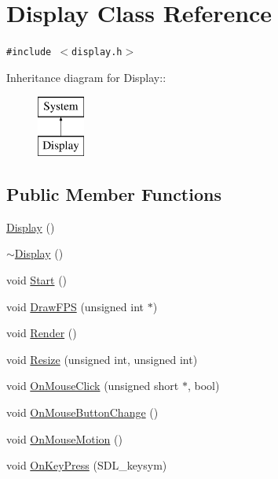 \hypertarget{class_display}{
\section{Display Class Reference}
\label{class_display}
}
{\tt \#include $<$display.h$>$}

Inheritance diagram for Display::\begin{figure}[H]
\begin{center}
\leavevmode
\includegraphics[height=2cm]{class_display}
\end{center}
\end{figure}
\subsection*{Public Member Functions}
\begin{CompactItemize}
\item 
\hyperlink{class_display_e972fffea6f7ca1d627ef48c3d841bb3}{Display} ()
\item 
\hyperlink{class_display_c2607a6bb236c55547a4223d40d85d1f}{$\sim$Display} ()
\item 
void \hyperlink{class_display_b811555d7bb26dba257ec5e7924788d9}{Start} ()
\item 
void \hyperlink{class_display_8881e9219d6d46ae604dcaf295a3e5bf}{DrawFPS} (unsigned int $\ast$)
\item 
void \hyperlink{class_display_72ec5b5207fbac8f5930b941714c8981}{Render} ()
\item 
void \hyperlink{class_display_a4d2ba3e82a44746ccfe827effa8eec6}{Resize} (unsigned int, unsigned int)
\item 
void \hyperlink{class_display_f72a499b8bc89ac50b41c7a1830e26f0}{OnMouseClick} (unsigned short $\ast$, bool)
\item 
void \hyperlink{class_display_29dfadd3a0a9c693df9ec49a94cd0b39}{OnMouseButtonChange} ()
\item 
void \hyperlink{class_display_1fe61057339c7f82a6a1d918d3ff619f}{OnMouseMotion} ()
\item 
void \hyperlink{class_display_58339797d54888001d3d416467a3d530}{OnKeyPress} (SDL\_\-keysym)
\end{CompactItemize}


